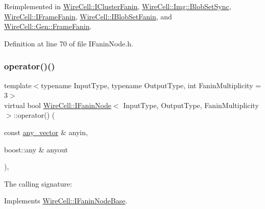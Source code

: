 Reimplemented in \hyperlink{class_wire_cell_1_1_i_cluster_fanin_a4021793d08233b3cb10f788d20d313c2}{Wire\+Cell\+::\+I\+Cluster\+Fanin}, \hyperlink{class_wire_cell_1_1_img_1_1_blob_set_sync_aa32d9014596aec6bcbdcd8ed027a95ad}{Wire\+Cell\+::\+Img\+::\+Blob\+Set\+Sync}, \hyperlink{class_wire_cell_1_1_i_frame_fanin_a7c19800cac1dc1bf67199b067811f500}{Wire\+Cell\+::\+I\+Frame\+Fanin}, \hyperlink{class_wire_cell_1_1_i_blob_set_fanin_a1783b57125c4b9df55a828ec832dbb72}{Wire\+Cell\+::\+I\+Blob\+Set\+Fanin}, and \hyperlink{class_wire_cell_1_1_gen_1_1_frame_fanin_aeba173a6fd84de2b655fe56fd41d8c05}{Wire\+Cell\+::\+Gen\+::\+Frame\+Fanin}.



Definition at line 70 of file I\+Fanin\+Node.\+h.

\mbox{\label{class_wire_cell_1_1_i_fanin_node_a36fa55f6c92585211789beab2e2ef46a}} 
\subsubsection{\texorpdfstring{operator()()}{operator()()}\hspace{0.1cm}{\footnotesize\ttfamily [1/2]}}
{\footnotesize\ttfamily template$<$typename Input\+Type, typename Output\+Type, int Fanin\+Multiplicity = 3$>$ \\
virtual bool \hyperlink{class_wire_cell_1_1_i_fanin_node}{Wire\+Cell\+::\+I\+Fanin\+Node}$<$ Input\+Type, Output\+Type, Fanin\+Multiplicity $>$\+::operator() (\begin{DoxyParamCaption}\item[{const \hyperlink{class_wire_cell_1_1_i_fanin_node_base_a9dc315fe5b56f41f13ea247fc4b7f34b}{any\+\_\+vector} \&}]{anyin,  }\item[{boost\+::any \&}]{anyout }\end{DoxyParamCaption})\hspace{0.3cm}{\ttfamily [inline]}, {\ttfamily [virtual]}}



The calling signature\+: 



Implements \hyperlink{class_wire_cell_1_1_i_fanin_node_base_a7fd741cc204d2eb03402709bff0694f2}{Wire\+Cell\+::\+I\+Fanin\+Node\+Base}.



